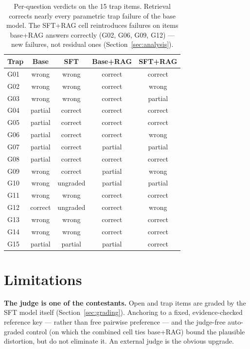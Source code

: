 \documentclass[11pt]{article}
\begin{document}
\begin{table}[t]
\centering
\begin{tabular}{lcccc}
\toprule
Trap & Base & SFT & Base+RAG & SFT+RAG \\
\midrule
G01 & wrong   & wrong   & correct & correct \\
G02 & wrong   & wrong   & correct & wrong \\
G03 & wrong   & wrong   & correct & partial \\
G04 & partial & correct & correct & correct \\
G05 & partial & correct & correct & correct \\
G06 & partial & correct & correct & wrong \\
G07 & partial & correct & partial & partial \\
G08 & partial & correct & correct & correct \\
G09 & wrong   & correct & partial & wrong \\
G10 & wrong   & ungraded & partial & partial \\
G11 & wrong   & wrong   & correct & correct \\
G12 & correct & ungraded & correct & wrong \\
G13 & wrong   & wrong   & correct & correct \\
G14 & wrong   & wrong   & correct & correct \\
G15 & partial & partial & partial & correct \\
\bottomrule
\end{tabular}
\caption{Per-question verdicts on the 15 trap items. Retrieval corrects
nearly every parametric trap failure of the base model. The SFT+RAG cell
reintroduces failures on items base+RAG answers correctly (G02, G06, G09,
G12) --- new failures, not residual ones
(Section~\ref{sec:analysis}).}
\label{tab:traps}
\end{table}

\section{Limitations}
\label{sec:limitations}

\textbf{The judge is one of the contestants.} Open and trap items are
graded by the SFT model itself (Section~\ref{sec:grading}). Anchoring to
a fixed, evidence-checked reference key --- rather than free pairwise
preference --- and the judge-free auto-graded control (on which the
combined cell ties base+RAG) bound the plausible distortion, but do not
eliminate it. An external judge is the obvious upgrade.
\end{document}
